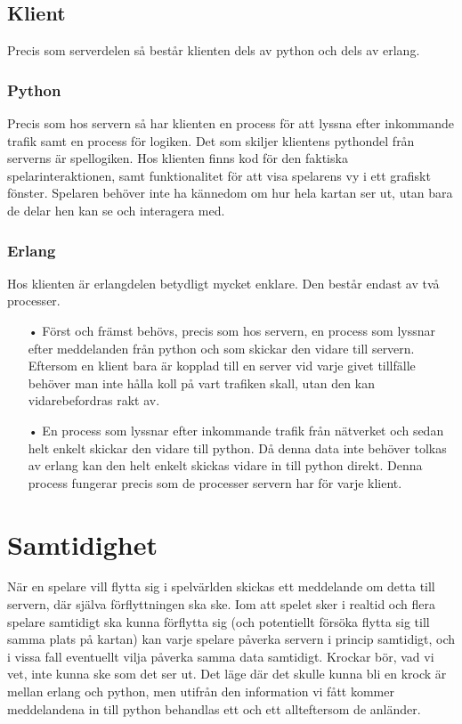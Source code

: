 \documentclass{scrartcl}
\begin{document}
\subsection{Klient}
Precis som serverdelen så består klienten dels av python och dels av erlang.

\subsubsection{Python}
Precis som hos servern så har klienten en process för att lyssna efter inkommande trafik samt en process för logiken.
\smallskip
Det som skiljer klientens pythondel från serverns är spellogiken. Hos klienten finns kod för den faktiska spelarinteraktionen, samt funktionalitet för att visa spelarens vy i ett grafiskt fönster.
Spelaren behöver inte ha kännedom om hur hela kartan ser ut, utan bara de delar hen kan se och interagera med.
\smallskip
\subsubsection{Erlang}
Hos klienten är erlangdelen betydligt mycket enklare. Den består endast av två processer.
\begin{enumerate}
\item[•] Först och främst behövs, precis som hos servern, en process som lyssnar efter meddelanden från python och som skickar den vidare till servern. Eftersom en klient bara är kopplad till en server vid varje givet tillfälle behöver man inte hålla koll på vart trafiken skall, utan den kan vidarebefordras rakt av.
\smallskip
\item[•] En process som lyssnar efter inkommande trafik från nätverket och sedan helt enkelt skickar den vidare till python. Då denna data inte behöver tolkas av erlang kan den helt enkelt skickas vidare in till python direkt. Denna process fungerar precis som de processer servern har för varje klient.
\end{enumerate}
\smallskip


\medskip
\section{Samtidighet}
När en spelare vill flytta sig i spelvärlden skickas ett meddelande om detta till servern, där själva förflyttningen ska ske. Iom att spelet sker i realtid och flera spelare samtidigt ska kunna förflytta sig (och potentiellt försöka flytta sig till samma plats på kartan) kan varje spelare påverka servern i princip samtidigt, och i vissa fall eventuellt vilja påverka samma data samtidigt.
Krockar bör, vad vi vet, inte kunna ske som det ser ut. Det läge där det skulle kunna bli en krock är mellan erlang och python, men utifrån den information vi fått kommer meddelandena in till python behandlas ett och ett allteftersom de anländer.
\end{document}
